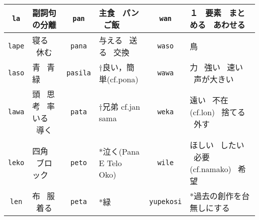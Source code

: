 \documentclass[a4paper,10pt,landscape]{article}
\begin{document}
{\begin{tabular}{|c|l||c|l||c|l|}
\hline \texttt{la} & 副詞句の分離  & \texttt{pan} & 主食  \  パン  \  ご飯  & \texttt{wan} & １  \  要素  \  まとめる  \  あわせる  \\
\hline \texttt{lape} & 寝る \ 休む  & \texttt{pana} & 与える  \  送る  \  交換  & \texttt{waso} & 鳥  \\
\hline \texttt{laso} & 青 \ 青緑  & \texttt{pasila} & †良い，簡単(cf.pona) & \texttt{wawa} & 力  \  強い  \  速い  \  声が大きい  \\
\hline \texttt{lawa} & 頭 \ 思考 \ 率いる \ 導く  & \texttt{pata} & †兄弟 cf.jan sama  & \texttt{weka} & 遠い  \  不在(cf.lon)  \  捨てる  \  外す  \\
\hline \texttt{leko} & 四角 \ ブロック  & \texttt{peto} & *泣く(Pana E Telo Oko) & \texttt{wile} & ほしい  \  したい  \  必要(cf.namako)  \  希望  \\
\hline \texttt{len} & 布 \ 服 \ 着る  & \texttt{peta} & *緑 & \texttt{yupekosi} & *過去の創作を台無しにする \\
\hline
\end{tabular}
}
\end{document}
